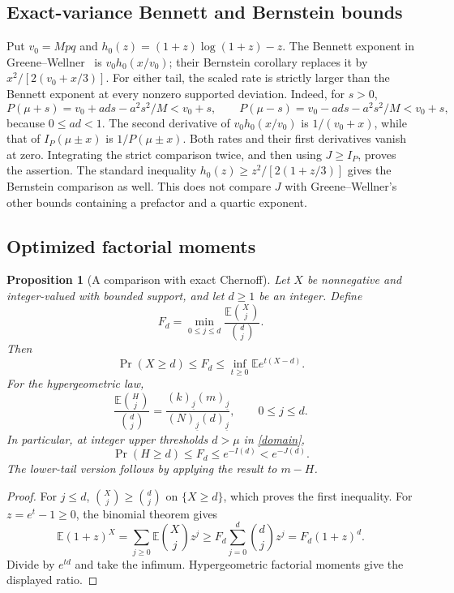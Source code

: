 \documentclass[11pt]{article}
\newtheorem{proposition}[theorem]{Proposition}
\newcommand{\E}{\mathbb E}
\begin{document}
\subsection{Exact-variance Bennett and Bernstein bounds}
Put $v_0=Mpq$ and $h_0(z)=(1+z)\log(1+z)-z$.
The Bennett exponent in Greene--Wellner~\cite[Theorem 3]{GW} is
$v_0h_0(x/v_0)$; their Bernstein corollary replaces it by
$x^2/[2(v_0+x/3)]$. For either tail, the scaled rate is strictly larger
than the Bennett exponent at every nonzero supported deviation.
Indeed, for $s>0$,
\[
 P(\mu+s)=v_0+ad s-a^2s^2/M<v_0+s,\qquad
 P(\mu-s)=v_0-ad s-a^2s^2/M<v_0+s,
\]
because $0\le ad<1$. The second derivative of $v_0h_0(x/v_0)$ is
$1/(v_0+x)$, while that of $I_P(\mu\pm x)$ is $1/P(\mu\pm x)$.
Both rates and their first derivatives vanish at zero. Integrating the
strict comparison twice, and then using $J\ge I_P$, proves the assertion.
The standard inequality $h_0(z)\ge z^2/[2(1+z/3)]$ gives the Bernstein
comparison as well. This does not compare $J$ with Greene--Wellner's
other bounds containing a prefactor and a quartic exponent.

\subsection{Optimized factorial moments}
\begin{proposition}[A comparison with exact Chernoff]\label{factorial}
Let $X$ be nonnegative and integer-valued with bounded support, and let
$d\ge1$ be an integer. Define
\[
 F_d=\min_{0\le j\le d}\frac{\E\binom Xj}{\binom dj}.
\]
Then
\[
 \Pr(X\ge d)\le F_d\le
 \inf_{t\ge0}\E e^{t(X-d)}.
\]
For the hypergeometric law,
\[
 \frac{\E\binom Hj}{\binom dj}
 =\frac{(k)_{\underline j}(m)_{\underline j}}
 {(N)_{\underline j}(d)_{\underline j}},\qquad 0\le j\le d.
\]
In particular, at integer upper thresholds $d>\mu$ in \eqref{domain},
\[
 \Pr(H\ge d)\le F_d\le e^{-I(d)}<e^{-J(d)}.
\]
The lower-tail version follows by applying the result to $m-H$.
\end{proposition}
\begin{proof}
For $j\le d$, $\binom Xj\ge\binom dj$ on $\{X\ge d\}$, which proves
the first inequality. For $z=e^t-1\ge0$, the binomial theorem gives
\[
 \E(1+z)^X=\sum_{j\ge0}\E\binom Xj z^j
 \ge F_d\sum_{j=0}^d\binom dj z^j=F_d(1+z)^d.
\]
Divide by $e^{td}$ and take the infimum. Hypergeometric factorial
moments give the displayed ratio.
\end{proof}
\end{document}
